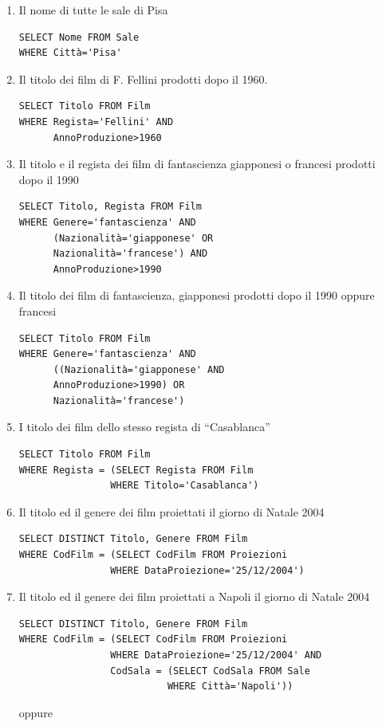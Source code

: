 \documentclass[a4paper]{article}
\begin{document}
\begin{enumerate}[leftmargin=*]
\item Il nome di tutte le sale di Pisa
\begin{verbatim}
SELECT Nome FROM Sale
WHERE Città='Pisa'
\end{verbatim}
\item Il titolo dei film di F. Fellini prodotti dopo il 1960.
\begin{verbatim}
SELECT Titolo FROM Film
WHERE Regista='Fellini' AND
      AnnoProduzione>1960
\end{verbatim}
\item Il titolo e il regista dei film di fantascienza giapponesi o francesi prodotti dopo il 1990
\begin{verbatim}
SELECT Titolo, Regista FROM Film
WHERE Genere='fantascienza' AND
      (Nazionalità='giapponese' OR
      Nazionalità='francese') AND
      AnnoProduzione>1990
\end{verbatim}
\item Il titolo dei film di fantascienza, giapponesi prodotti dopo il 1990 oppure francesi
\begin{verbatim}
SELECT Titolo FROM Film
WHERE Genere='fantascienza' AND
      ((Nazionalità='giapponese' AND
      AnnoProduzione>1990) OR
      Nazionalità='francese')
\end{verbatim}
\item I titolo dei film dello stesso regista di “Casablanca”
\begin{verbatim}
SELECT Titolo FROM Film
WHERE Regista = (SELECT Regista FROM Film
                WHERE Titolo='Casablanca')
\end{verbatim}
\item Il titolo ed  il genere dei film proiettati il giorno di Natale 2004
\begin{verbatim}
SELECT DISTINCT Titolo, Genere FROM Film
WHERE CodFilm = (SELECT CodFilm FROM Proiezioni
                WHERE DataProiezione='25/12/2004')
\end{verbatim}
\item  Il titolo ed  il genere dei film proiettati a Napoli il giorno di Natale 2004
\begin{verbatim}
SELECT DISTINCT Titolo, Genere FROM Film
WHERE CodFilm = (SELECT CodFilm FROM Proiezioni
                WHERE DataProiezione='25/12/2004' AND
                CodSala = (SELECT CodSala FROM Sale
                          WHERE Città='Napoli'))
\end{verbatim}
oppure
\begin{verbatim}

\end{verbatim}
\end{enumerate}
\end{document}
